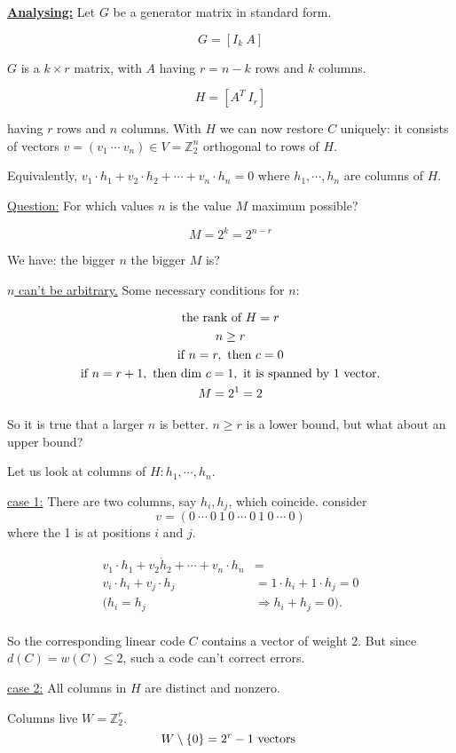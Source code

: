 \documentclass{article}
\newcommand{\eqs}[1]{
	\begin{gather*}
		#1
	\end{gather*}
}
\renewcommand{\b}[1]{\textbf{#1}}
\newcommand{\ul}[1]{\underline{#1}}
\renewcommand{\aligned}[1]{
	\begin{align*}
		#1
	\end{align*}
}
\newcommand{\newdef}[2]{\b{\ul{#1:}} #2}
\begin{document}
\newdef{Analysing}{
Let $G$ be a generator matrix in standard form.

\[G = [I_k\ A]\]

$G$ is a $k \times r$ matrix, with $A$ having $r = n-k$ rows and $k$ columns.

\[H = [A^T\ I_{r}]\]

having $r$ rows and $n$ columns. With $H$ we can now restore $C$ uniquely: it
consists of vectors $v = (v_1\ \cdots\ v_n) \in V = \mathbb{Z}^n_2$ orthogonal
to rows of $H$.

Equivalently, $v_1 \cdot h_1 + v_2 \cdot h_2 + \cdots + v_n \cdot h_n = 0$
where $h_1, \cdots, h_n$ are columns of $H$.
}

\ul{Question:} For which values $n$ is the value $M$ maximum possible?

\[M = 2^k = 2^{n-r}\]

We have: the bigger $n$ the bigger $M$ is?

\ul{$n$ can't be arbitrary.} Some necessary conditions for $n$:
\eqs {
	\textnormal{the rank of } H = r \\
	n \geq r \\
	\textnormal{if } n = r, \textnormal{ then } c = 0 \\
	\textnormal{if } n = r + 1, \textnormal{ then dim } c = 1, \textnormal{ it is spanned by 1 vector.} \\
	M = 2^1 = 2
}
So it is true that a larger $n$ is better. $n \geq r$ is a lower bound, but
what about an upper bound?

Let us look at columns of $H: h_1, \cdots, h_n$.

\ul{case 1:} There are two columns, say $h_i, h_j$, which coincide. consider
\[v = (0\ \cdots\ 0\ 1\ 0\ \cdots\ 0\ 1\ 0\ \cdots\ 0) \]
where the 1 is at positions $i$ and $j$.
\aligned {
	v_1 \cdot h_1 + v_2 \dot h_2 + \cdots + v_n \cdot h_n & =                               \\
	v_i \cdot h_i + v_j \cdot h_j                         & = 1 \cdot h_i + 1 \cdot h_j = 0 \\
	(h_i = h_j                                            & \Rightarrow h_i + h_j = 0).     \\
}
So the corresponding linear code $C$ contains a vector of weight 2. But since
$d(C) = w(C) \leq 2$, such a code can't correct errors.

\ul{case 2:} All columns in $H$ are distinct and nonzero.

Columns live $W = \mathbb{Z}^r_2$.
\[W \setminus \{0\} = 2^r - 1 \textnormal{ vectors }\]
\end{document}
